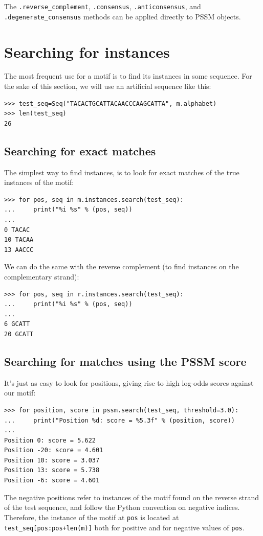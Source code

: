 \documentclass{report}
\begin{document}
The \verb+.reverse_complement+, \verb+.consensus+, \verb+.anticonsensus+, and
\verb+.degenerate_consensus+ methods can be applied directly to PSSM objects.

\section{Searching for instances}
\label{sec:search}

The most frequent use for a motif is to find its instances in some
sequence. For the sake of this section, we will use an artificial sequence like this:

\begin{verbatim}
>>> test_seq=Seq("TACACTGCATTACAACCCAAGCATTA", m.alphabet)
>>> len(test_seq)
26
\end{verbatim}

\subsection{Searching for exact matches}

The simplest way to find instances, is to look for exact matches of
the true instances of the motif:
\begin{verbatim}
>>> for pos, seq in m.instances.search(test_seq):
...     print("%i %s" % (pos, seq))
... 
0 TACAC
10 TACAA
13 AACCC
\end{verbatim}
We can do the same with the reverse complement (to find instances on the complementary strand):
\begin{verbatim}
>>> for pos, seq in r.instances.search(test_seq):
...     print("%i %s" % (pos, seq))
... 
6 GCATT
20 GCATT
\end{verbatim}

\subsection{Searching for matches using the PSSM score}

It's just as easy to look for positions, giving rise to high log-odds scores against our motif:
\begin{verbatim}
>>> for position, score in pssm.search(test_seq, threshold=3.0):
...     print("Position %d: score = %5.3f" % (position, score))
... 
Position 0: score = 5.622
Position -20: score = 4.601
Position 10: score = 3.037
Position 13: score = 5.738
Position -6: score = 4.601
\end{verbatim}
The negative positions refer to instances of the motif found on the
reverse strand of the test sequence, and follow the Python convention
on negative indices. Therefore, the instance of the motif at \verb|pos|
is located at \verb|test_seq[pos:pos+len(m)]| both for positive and for
negative values of \verb|pos|.
\end{document}
